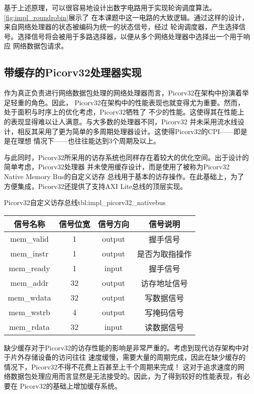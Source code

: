 
基于上述原理，可以很容易地设计出数字电路用于实现轮询调度算法。\autoref{fig:impl_roundrobin}展示了
在本课题中这一电路的大致逻辑。通过这样的设计，来自网络处理器的状态被编码为统一的状态信号，经过
轮询调度器，产生选择信号。选择信号将会被用于多路选择器，以便从多个网络处理器中选择出一个用于响应
网络数据包请求。

\subsection{带缓存的Picorv32处理器实现}

作为真正负责进行网络数据包处理的网络处理器而言，Picorv32在架构中扮演着举足轻重的角色。因此，
Picorv32在架构中的性能表现也就变得尤为重要。然而，处于面积与时序上的优化考虑，Picorv32牺牲了
不少的性能\cite{picorv32}。这使得其在性能上的表现显得难以让人满意。与大多数的处理器不同，Picorv32
并未采用流水线设计，相反其采用了更为简单的多周期处理器设计。这使得Picorv32的CPI——即是是在理想
情况下——也往往能达到3个周期及以上。

与此同时，Picorv32所采用的访存系统也同样存在着较大的优化空间。出于设计的简单考虑，Picorv32处理器
并未使用缓存设计，而是使用了被称为Picorv32 Native Memory Bus\cite{picorv32}的自定义访存
总线用于基本的访存操作。在此基础上，为了方便集成，Picorv32还提供了支持AXI Lite总线的顶层实现。

\begin{generaltab}{Picorv32自定义访存总线\cite{picorv32}}{tbl:impl_picorv32_nativebus}
  \begin{tabular}{cccc}
    \toprule
    信号名称 & 信号位宽 & 信号方向 & 信号说明 \\
    \midrule
    mem\_valid & 1 & output & 握手信号 \\
    mem\_instr & 1 & output & 是否为取指操作 \\
    mem\_ready & 1 & input & 握手信号 \\
    mem\_addr & 32 & output & 访存地址信号 \\
    mem\_wdata & 32 & output & 写数据信号 \\
    mem\_wstrb & 4 & output & 写掩码信号 \\
    mem\_rdata & 32 & input & 读数据信号 \\
    \bottomrule
  \end{tabular}
\end{generaltab}

缺少缓存对于Picorv32的访存性能的影响是非常严重的。考虑到现代访存架构中对于片外存储设备的访问往往
速度缓慢，需要大量的周期完成，因此在缺少缓存的情况下，Picorv32不得不花费上百甚至上千个周期来完成！
这对于追求速度的网络数据包处理应用而言显然是无法接受的。因此，为了得到较好的性能表现，有必要在
Picorv32的基础上增加缓存系统。

